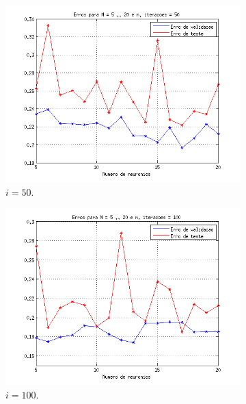 		\begin{figure}[H] 
				
			\centering
			
				\begin{subfigure}{.33\textwidth}
				  \centering
				  \includegraphics[width=1\linewidth]{image/mlp_50_iterations}
				  \caption{\(i=50\).}
				\end{subfigure}%
				\begin{subfigure}{.33\textwidth}
				  \centering
				  \includegraphics[width=1\linewidth]{image/mlp_100_iterations}
				  \caption{\(i=100\).}
			\end{subfigure}
			\begin{subfigure}{.33\textwidth}

\end{subfigure}
\end{figure}
